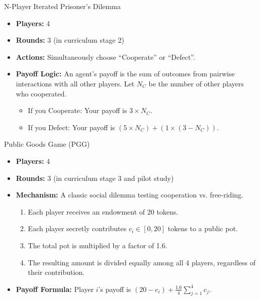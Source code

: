\documentclass[11pt]{article}
\begin{document}
\begin{gamebox}{N-Player Iterated Prisoner's Dilemma}
\begin{itemize}
    \item \textbf{Players:} 4
    \item \textbf{Rounds:} 3 (in curriculum stage 2)
    \item \textbf{Actions:} Simultaneously choose ``Cooperate'' or ``Defect''.
    \item \textbf{Payoff Logic:} An agent's payoff is the sum of outcomes from pairwise interactions with all other players. Let $N_C$ be the number of other players who cooperated.
        \begin{itemize}
            \item If you Cooperate: Your payoff is $3 \times N_C$.
            \item If you Defect: Your payoff is $(5 \times N_C) + (1 \times (3 - N_C))$.
        \end{itemize}
\end{itemize}
\end{gamebox}


\begin{gamebox}{Public Goods Game (PGG)}
\begin{itemize}
    \item \textbf{Players:} 4
    \item \textbf{Rounds:} 3 (in curriculum stage 3 and pilot study)
    \item \textbf{Mechanism:} A classic social dilemma testing cooperation vs. free-riding.
        \begin{enumerate}
            \item Each player receives an endowment of 20 tokens.
            \item Each player secretly contributes $c_i \in [0, 20]$ tokens to a public pot.
            \item The total pot is multiplied by a factor of 1.6.
            \item The resulting amount is divided equally among all 4 players, regardless of their contribution.
        \end{enumerate}
    \item \textbf{Payoff Formula:} Player $i$'s payoff is $(20 - c_i) + \frac{1.6}{4} \sum_{j=1}^{4} c_j$.
\end{itemize}
\end{gamebox}
\end{document}
